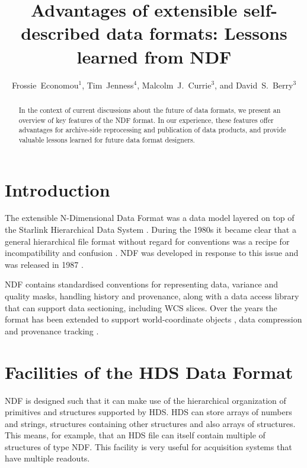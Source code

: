 \documentclass[11pt,twoside]{article}
\begin{document}
\title{Advantages of extensible self-described data formats: Lessons learned from NDF}
\author{Frossie~Economou$^1$, Tim~Jenness$^4$, Malcolm~J.~Currie$^3$,
and David~S.~Berry$^3$
}

\begin{abstract}
  In the context of current discussions about the future of data
  formats, we present an overview of key features of the NDF
  format. In our experience, these features offer advantages for
  archive-side reprocessing and publication of data products, and
  provide valuable lessons learned for future data format designers.
\end{abstract}

\section{Introduction}

The extensible N-Dimensional Data Format
\citep[NDF;][]{1993ASPC...52..229W,SGP38} was a data model layered on
top of the Starlink Hierarchical Data System
\citep[HDS;][]{1982QJRAS..23..485D}. During the 1980s it became clear
that a general hierarchical file format without regard for conventions
was a recipe for incompatibility and confusion \citep[see
e.g.][]{1993ASPC...52..219S}. NDF was developed in response to this
issue and was released in 1987 \citep[see
e.g.][]{1988STARB...2...11C}.

NDF contains standardised conventions for representing data,
variance and quality masks, handling history and provenance, along
with a data access library that can support data sectioning, including
WCS slices. Over the years the format has been extended to support
world-coordinate objects \citep{2001ASPC..238..129B}, data compression
\citep{2008ASPC..394..650C} and provenance tracking
\citep{2009ASPC..411..418J}.

\section{Facilities of the HDS Data Format}

NDF is designed such that it can make use of the hierarchical
organization of primitives and structures supported by HDS. HDS can
store arrays of numbers and strings, structures containing other
structures and also arrays of structures. This means, for example,
that an HDS file can itself contain multiple of structures of type
NDF. This facility is very useful for acquisition systems that have
multiple readouts.
\end{document}
